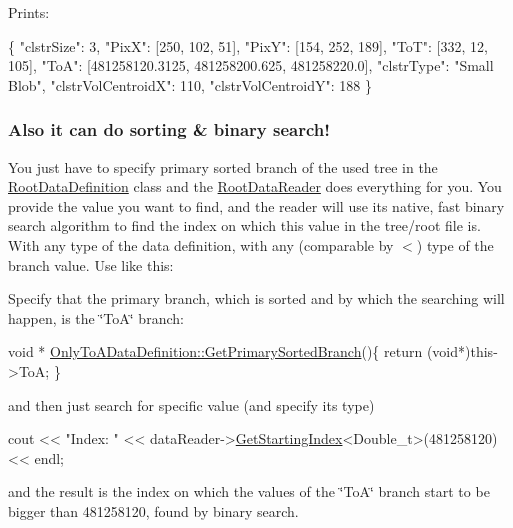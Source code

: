 Prints\+:


\begin{DoxyCode}
\{
    \textcolor{stringliteral}{"clstrSize"}: 3, 
    \textcolor{stringliteral}{"PixX"}: [250, 102, 51], 
    \textcolor{stringliteral}{"PixY"}: [154, 252, 189], 
    \textcolor{stringliteral}{"ToT"}: [332, 12, 105], 
    \textcolor{stringliteral}{"ToA"}: [481258120.3125, 481258200.625, 481258220.0], 
    \textcolor{stringliteral}{"clstrType"}: \textcolor{stringliteral}{"Small Blob"}, 
    \textcolor{stringliteral}{"clstrVolCentroidX"}: 110, 
    \textcolor{stringliteral}{"clstrVolCentroidY"}: 188
\}
\end{DoxyCode}


\subsubsection*{Also it can do sorting \& binary search!}

You just have to specify primary sorted branch of the used tree in the \hyperlink{classRootDataDefinition}{Root\+Data\+Definition} class and the \hyperlink{classRootDataReader}{Root\+Data\+Reader} does everything for you. You provide the value you want to find, and the reader will use its native, fast binary search algorithm to find the index on which this value in the tree/root file is. With any type of the data definition, with any (comparable by $<$) type of the branch value. Use like this\+:

Specify that the primary branch, which is sorted and by which the searching will happen, is the \char`\"{}\+To\+A\char`\"{} branch\+: 
\begin{DoxyCode}
\textcolor{keywordtype}{void} * \hyperlink{classOnlyToADataDefinition_af2025f39b59dc8bd50a281f5034ed47a}{OnlyToADataDefinition::GetPrimarySortedBranch}()\{
    \textcolor{keywordflow}{return} (\textcolor{keywordtype}{void}*)this->ToA;
\}
\end{DoxyCode}


and then just search for specific value (and specify its type)


\begin{DoxyCode}
cout << \textcolor{stringliteral}{"Index: "} << dataReader->\hyperlink{classRootDataReader_a04d8033b9761cc8c673af9bb96adfc03}{GetStartingIndex}<Double\_t>(481258120) << endl;
\end{DoxyCode}


and the result is the index on which the values of the \char`\"{}\+To\+A\char`\"{} branch start to be bigger than 481258120, found by binary search.

